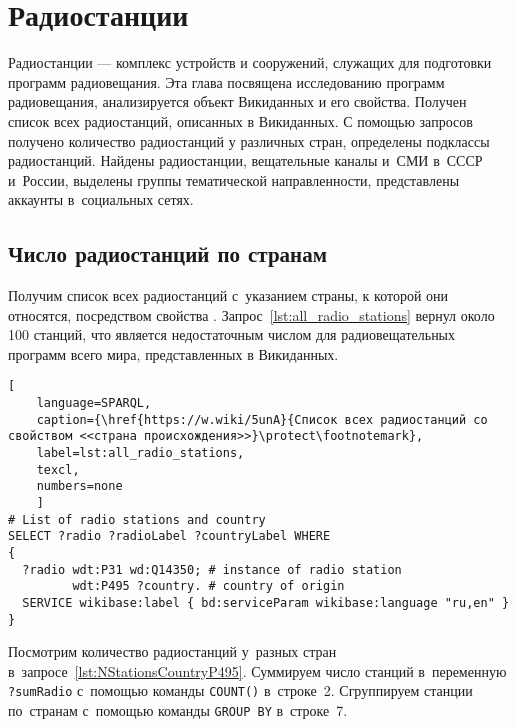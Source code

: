 \chapter[Радиостанции]{Радиостанции}
\label{ch:radio-station}

Радиостанции --- комплекс устройств и сооружений, служащих для подготовки программ радиовещания. 
Эта глава посвящена исследованию программ радиовещания, 
анализируется объект Викиданных  и его свойства. 
Получен список всех радиостанций, описанных в Викиданных. 
С помощью запросов получено количество радиостанций у различных стран, 
определены подклассы радиостанций. 
Найдены радиостанции, вещательные каналы и~СМИ в~СССР и~России, 
выделены группы тематической направленности, 
представлены аккаунты в~социальных сетях.

\section{Число радиостанций по странам}

Получим список всех радиостанций с~указанием страны, к которой они относятся, 
посредством свойства . 
Запрос~\ref{lst:all_radio_stations} вернул около 100 станций, 
что является недостаточным числом для радиовещательных программ всего мира, представленных в Викиданных.

\begin{lstlisting}[ 
    language=SPARQL,
    caption={\href{https://w.wiki/5unA}{Cписок всех радиостанций со свойством <<страна происхождения>>}\protect\footnotemark},
    label=lst:all_radio_stations,
    texcl,
    numbers=none
    ]
# List of radio stations and country
SELECT ?radio ?radioLabel ?countryLabel WHERE
{
  ?radio wdt:P31 wd:Q14350; # instance of radio station
         wdt:P495 ?country. # country of origin
  SERVICE wikibase:label { bd:serviceParam wikibase:language "ru,en" }
}
\end{lstlisting}%


Посмотрим количество радиостанций у~разных стран в~запросе~\ref{lst:NStationsCountryP495}.
Суммируем число станций в~переменную \lstinline|?sumRadio| 
с~помощью команды \lstinline|COUNT()| в~строке~2. 
Сгруппируем станции по~странам с~помощью команды \lstinline|GROUP BY| в~строке~7.



